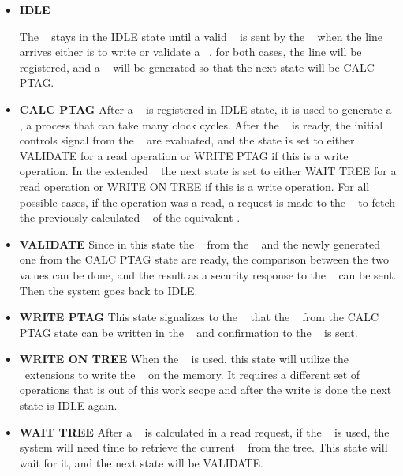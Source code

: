 \begin{itemize}
  \item{\textbf{IDLE}}
 
The \seceng~ stays in the IDLE  state until a valid \sline~ is sent by the \handler~ when the line arrives either is to write or validate a \ptag~, for both cases, the line will be registered, and a \ptag~ will be generated so that the next state will be CALC PTAG. 
 
  \item{\textbf{CALC PTAG}}
  After a \sline~ is registered in IDLE state, it is used to generate a \ptag, a process that can take many clock cycles. After the \ptag~ is ready, the initial controls signal from the \handler~ are evaluated, and the state is set to either VALIDATE for a read operation or  WRITE PTAG if this is a write operation.  In the extended \cshia~ the next state is set to either WAIT TREE for a read operation or  WRITE ON TREE if this is a write operation. For all possible cases, if the operation was a read, a request is made to the \pmmu~ to fetch the previously calculated \ptag~ of the equivalent \sline.
  

  \item{\textbf{VALIDATE}}
  Since in this state the \ptag~ from the \ptagmem~ and the newly generated one from the CALC PTAG state are ready, the comparison between the two values can be done, and the result as a security response to the \handler~ can be sent. Then the system goes back to IDLE.
  

 \item{\textbf{WRITE PTAG}}
  This state signalizes to the \pmmu~  that the \ptag~ from the CALC PTAG state can be written in the \ptagmem~ and confirmation to the \handler~ is sent.
  
   \item{\textbf{WRITE ON TREE}}
  When the \mt~ is used, this state will utilize the \cshia~extensions to write the \ptag~  on the memory. It requires a different set of operations that is out of this work scope and after the write is done the next state is IDLE again.
  
  \item{\textbf{WAIT TREE}}
  After a \ptag~ is calculated in a read request, if the \mt~ is used,  the system will need time to retrieve the current \ptag~ from the tree. This state will wait for it, and the next state will be VALIDATE.

\end{itemize}

